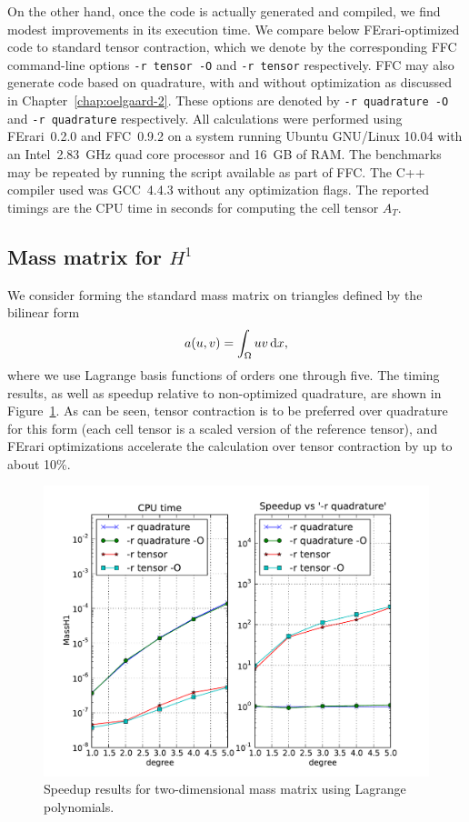 On the other hand, once the code is actually generated and compiled,
we find modest improvements in its execution time. We compare below
FErari-optimized code to standard tensor contraction, which we denote
by the corresponding FFC command-line options \texttt{-r tensor -O}
and \texttt{-r tensor} respectively. FFC may also generate code based
on quadrature, with and without optimization as discussed in
Chapter~\ref{chap:oelgaard-2}. These options are denoted by \texttt{-r
  quadrature -O} and \texttt{-r quadrature} respectively. All
calculations were performed using FErari~0.2.0 and FFC~0.9.2 on a
system running Ubuntu GNU/Linux 10.04 with an Intel~2.83~GHz quad core
processor and 16~GB of RAM. The benchmarks may be repeated by running
the script  available as part of FFC. The C++
compiler used was GCC~4.4.3 without any optimization flags. The
reported timings are the CPU time in seconds for computing the cell
tensor $A_T$.

\subsection{Mass matrix for $H^1$}

We consider forming the standard mass matrix on triangles defined by
the bilinear form
\begin{equation} \label{eq:MassH1}
  a(u, v) = \int_{\Omega} u v \, \mathrm{d}x,
\end{equation}
where we use Lagrange basis functions of orders one through five. The
timing results, as well as speedup relative to non-optimized quadrature,
are shown in Figure~\ref{fig:MassH1}. As can be seen, tensor
contraction is to be preferred over quadrature for this form (each
cell tensor is a scaled version of the reference tensor), and FErari
optimizations accelerate the calculation over tensor contraction by up
to about 10\%.

\begin{figure}
  \centering
  \includegraphics[width=\largefig]{chapters/kirby-3/pdf/MassH1.pdf}
  \caption{Speedup results for two-dimensional mass matrix using Lagrange polynomials.}
  \label{fig:MassH1}
\end{figure}

